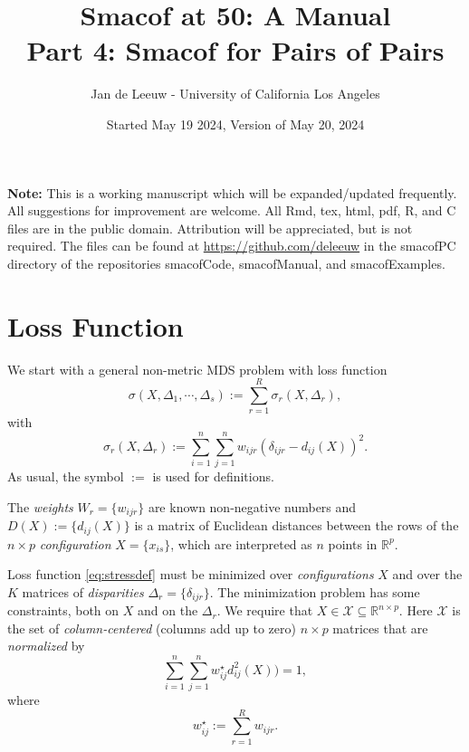 \documentclass[
  12pt,
]{article}
\title{Smacof at 50: A Manual\\
Part 4: Smacof for Pairs of Pairs}
\author{Jan de Leeuw - University of California Los Angeles}
\date{Started May 19 2024, Version of May 20, 2024}
\newcommand{\sectionbreak}{\clearpage}
\begin{document}
\maketitle

{
\setcounter{tocdepth}{3}
\tableofcontents
}
\textbf{Note:} This is a working manuscript which will be expanded/updated
frequently. All suggestions for improvement are welcome. All Rmd, tex,
html, pdf, R, and C files are in the public domain. Attribution will be
appreciated, but is not required. The files can be found at
\url{https://github.com/deleeuw} in the smacofPC directory of the
repositories smacofCode, smacofManual, and smacofExamples.

\sectionbreak

\section{Loss Function}\label{loss-function}

We start with a general non-metric MDS problem with
loss function
\begin{equation}
\sigma(X,\Delta_1,\cdots,\Delta_s):=\sum_{r=1}^R\sigma_r(X,\Delta_r),
\label{eq:stressdef}
\end{equation}
with
\begin{equation}
\sigma_r(X,\Delta_r):=\sum_{i=1}^n\sum_{j=1}^n w_{ijr}(\delta_{ijr}-d_{ij}(X))^2.
\label{eq:rstressdef}
\end{equation}
As usual, the symbol \(:=\) is used for definitions.

The \emph{weights} \(W_r=\{w_{ijr}\}\) are known non-negative
numbers and \(D(X):=\{d_{ij}(X)\}\) is a matrix of Euclidean distances
between the rows of the \(n\times p\) \emph{configuration} \(X=\{x_{is}\}\), which are interpreted as \(n\) points in \(\mathbb{R}^p\).

Loss function \eqref{eq:stressdef} must be minimized over \emph{configurations} \(X\) and over the \(K\) matrices of \emph{disparities} \(\Delta_r=\{\delta_{ijr}\}\). The minimization problem has some constraints, both on \(X\) and on the \(\Delta_r\).
We require that \(X\in\mathcal{X}\subseteq\mathbb{R}^{n\times p}\). Here \(\mathcal{X}\) is the set of \emph{column-centered} (columns add up to zero) \(n\times p\) matrices that are \emph{normalized} by
\begin{equation}
\sum_{i=1}^n\sum_{j=1}^n w_{ij}^\star d_{ij}^2(X))=1,
\label{eq:xscale}
\end{equation}
where
\begin{equation}
w_{ij}^\star:=\sum_{r=1}^R w_{ijr}.
\label{eq:wstardef}
\end{equation}
\end{document}
